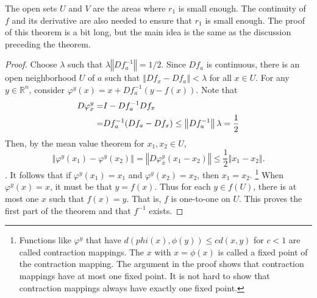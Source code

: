 \documentclass[12pt,reqno]{amsart}
\theoremstyle{definition}
\def\R{\mathbb{R}}
\newcommand{\norm}[1]{\left\Vert {#1} \right\Vert}
\begin{document}
The open sets $U$ and $V$ are the areas where $r_1$ is small
enough. The continuity of $f$ and its derivative are also needed to
ensure that $r_1$ is small enough. The proof of this theorem is a bit
long, but the main idea is the same as the discussion preceding the
theorem.
\begin{proof}
  Choose $\lambda$ such that $\lambda \norm{Df_a^{-1}} = 1/2$. Since
  $Df_a$ is continuous, there is an open neighborhood $U$ of $a$ such
  that $\norm{Df_x - Df_a} < \lambda$ for all $x \in U$. For any $y
  \in \R^n$, consider $\varphi^y(x) = x + Df_a^{-1} \left(y - f(x)
  \right)$. Note that 
  \begin{align}
    D \varphi^y_x = & I - Df_a^{-1} Df_x \notag \\ 
    = & Df_a^{-1} (Df_a - Df_x) \leq \norm{Df_a^{-1}} \lambda =
    \frac{1}{2} \label{e50}
  \end{align}
  Then, by the mean value theorem for $x_1, x_2 \in U$, 
  \[ \norm{\varphi^y(x_1) - \varphi^y(x_2)} = \norm{D\varphi^y_{\bar{x}}
    (x_1 - x_2) } \leq \frac{1}{2} \norm{x_1 - x_2}. \].
  It follows that if $\varphi^y(x_1) = x_1$ and $\varphi^y(x_2) =
  x_2$, then $x_1 = x_2$.
  \footnote{Functions like $\varphi^y$ that have $d(phi(x),\phi(y))
    \leq c d(x,y)$ for $c<1$ are called contraction mappings. The $x$
    with $x=\phi(x)$ is called a fixed point of the contraction
    mapping. The argument in the proof shows that contraction mappings
    have at most one fixed point. It is not hard to show that
    contraction mappings always have exactly one fixed point.}
  When $\varphi^y(x) = x$, it must be that $y = f(x)$. Thus for each
  $y \in f(U)$, there is at most one $x$ such that $f(x) = y$. That
  is, $f$ is one-to-one on $U$. This proves the first part of the
  theorem and that $f^{-1}$ exists. 


\end{proof}
\end{document}
